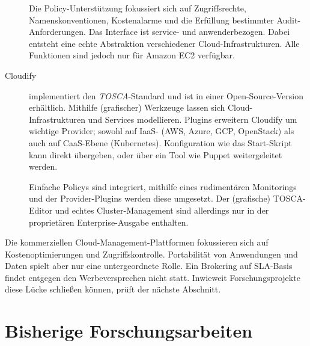 \begin{description}
	Die Policy-Unterstützung fokussiert sich auf Zugriffsrechte, Namenskonventionen, Kostenalarme und die Erfüllung bestimmter Audit-Anforderungen. Das Interface ist service- und anwenderbezogen. Dabei entsteht eine echte Abstraktion verschiedener Cloud-Infrastrukturen. Alle Funktionen sind jedoch nur für Amazon EC2 verfügbar.
	
	\item[Cloudify\footnotemark] implementiert den \emph{TOSCA}-Standard und ist in einer Open-Source-Version erhältlich. Mithilfe (grafischer) Werkzeuge lassen sich Cloud-In\-fra\-struk\-tur\-en und Services modellieren. Plugins erweitern Cloudify um wichtige Provider; sowohl auf IaaS- (AWS, Azure, GCP, OpenStack) als auch auf CaaS-Ebene (Kubernetes). Konfiguration wie das Start-Skript kann direkt übergeben, oder über ein Tool wie Puppet weitergeleitet werden. 
	
	Einfache Policys sind integriert, mithilfe eines rudimentären Monitorings und der Provider-Plugins werden diese umgesetzt. Der (grafische) TOSCA-Editor und echtes Cluster-Management sind allerdings nur in der proprietären Enterprise-Ausgabe enthalten.


\end{description}

Die kommerziellen Cloud-Management-Plattformen fokussieren sich auf Kostenoptimierungen und Zugriffskontrolle. Portabilität von Anwendungen und Daten spielt aber nur eine untergeordnete Rolle. Ein Brokering auf SLA-Basis findet entgegen den Werbeversprechen nicht statt. Inwieweit Forschungsprojekte diese Lücke schließen können, prüft der nächste Abschnitt.



%
%

%
%
%
%
%


\section{Bisherige Forschungsarbeiten}

